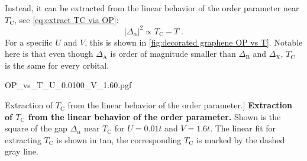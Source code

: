 \documentclass[../notes.tex]{subfiles}
\begin{document}
Instead, it can be extracted from the linear behavior of the order parameter near \(T_{\mathrm{C}}\), see \cref{eq:extract TC via OP}:
\begin{equation}
	\vert \Delta_{\alpha} \vert^2 \propto T_{\mathrm{C}} - T \;.
\end{equation}
For a specific \(U\) and \(V\), this is shown in \cref{fig:decorated graphene OP vs T}.
Notable here is that even though \(\Delta_{\mathrm{A}}\) is order of magnitude smaller than \(\Delta_{\mathrm{B}}\) and \(\Delta_{\mathrm{X}}\), \(T_{\mathrm{C}}\) is the same for every orbital.
\begin{SCfigure}[1][tb]
	\centering
	{OP_vs_T_U_0.0100_V_1.60.pgf}
	\caption
		[Extraction of \(T_{\mathrm{C}}\) from the linear behavior of the order parameter.]{
		\textbf{Extraction of \(T_{\mathrm{C}}\) from the linear behavior of the order parameter.}
		Shown is the square of the gap \(\Delta_{\alpha}\) near \(T_{\mathrm{C}}\) for \(U = 0.01 t\) and \(V = 1.6 t\). The linear fit for extracting \(T_{\mathrm{C}}\) is shown in tan, the corresponding \(T_{\mathrm{C}}\) is marked by the dashed gray line.
	}
	\label{fig:decorated graphene OP vs T}
\end{SCfigure}
\end{document}

